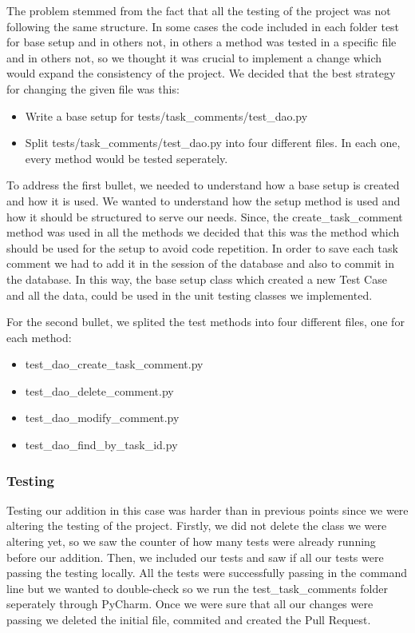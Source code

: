 \documentclass{article}
\begin{document}
The problem stemmed from the fact that all the testing of the project was not following the same structure. In some cases the code included in each folder test for base setup and in others not, in others a method was tested in a specific file and in others not, so we thought it was crucial to implement a change which would expand the consistency of the project. We decided that the best strategy for changing the given file was this:
\begin{itemize}
  \item Write a base setup for tests/task\_comments/test\_dao.py
  \item Split  tests/task\_comments/test\_dao.py into four different files. In each one, every method would be tested seperately.
\end{itemize}

To address the first bullet, we needed to understand how a base setup is created and how it is used. We wanted to understand how the setup method is used and how it should be structured to serve our needs. Since, the create\_task\_comment method  was used in all the methods we decided that this was the method which should be used for the setup to avoid code repetition. In order to save each task comment we had to add it in the session of the database and also to commit in the database. In this way, the base setup class which created a new Test Case and all the data, could be used in the unit testing classes we implemented. 

For the second bullet, we splited the test methods into four different files, one for each method:
\begin{itemize}
  \item test\_dao\_create\_task\_comment.py 
  \item test\_dao\_delete\_comment.py  
  \item test\_dao\_modify\_comment.py 
  \item test\_dao\_find\_by\_task\_id.py 
\end{itemize}
\subsubsection{Testing}
\hspace{0.5cm}Testing our addition in this case was harder than in previous points since we were altering the testing of the project. Firstly, we did not delete the class we were altering yet, so we saw the counter of how many tests were already running before our addition. Then, we included our tests and saw if all our tests were passing the testing locally. All the tests were successfully passing in the command line but we wanted to double-check so we run the test\_task\_comments folder seperately through PyCharm. Once we were sure that all our changes were passing we deleted the initial file, commited and created the Pull Request.
\end{document}
